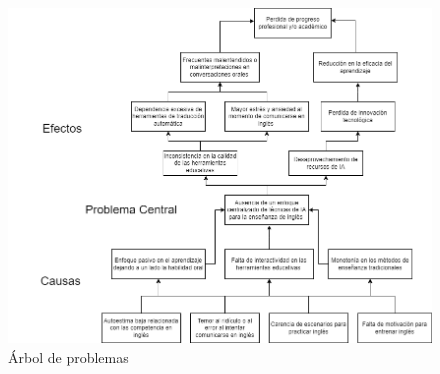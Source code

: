 \begin{figure}[H]
    \centering
    \includegraphics[width=1\linewidth]{Imagenes/seminario Arbol de problemas.png}
    \caption{Árbol de problemas}
    \label{fig:enter-label}
\end{figure}





 
 

